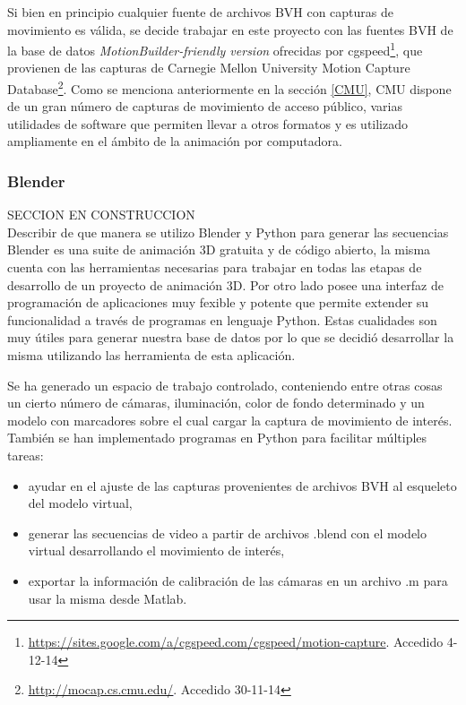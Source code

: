 Si bien en principio cualquier fuente de archivos BVH con capturas de movimiento es válida, se decide trabajar en este proyecto con las fuentes BVH de la base de datos \textit{MotionBuilder-friendly version} ofrecidas por cgspeed\footnote{\textcolor{blue}{\underline{\url{https://sites.google.com/a/cgspeed.com/cgspeed/motion-capture}}}. Accedido 4-12-14},
 que provienen de las capturas de Carnegie Mellon University Motion Capture Database\footnote{\textcolor{blue}{\underline{\url{http://mocap.cs.cmu.edu/}}}. Accedido 30-11-14}. 
 Como se menciona anteriormente en la sección \ref{CMU}, CMU dispone de un gran número de capturas de movimiento de acceso público, varias utilidades de software que permiten llevar a otros formatos y es utilizado ampliamente en el ámbito de la animación por computadora.




\subsubsection{Blender} SECCION EN CONSTRUCCION\\
Describir de que manera se utilizo Blender y  Python para generar las secuencias\\



Blender es una suite de animación 3D gratuita y de código abierto, la misma cuenta con las herramientas necesarias para trabajar en todas las etapas de desarrollo de un proyecto de animación 3D. Por otro lado posee una interfaz de programación de aplicaciones muy fexible y potente que permite extender su funcionalidad a través de programas en lenguaje Python. Estas cualidades son muy útiles para generar nuestra base de datos por lo que se decidió desarrollar la misma utilizando las herramienta de esta aplicación.

Se ha generado un espacio de trabajo controlado, conteniendo entre otras cosas un cierto número de cámaras, iluminación, color de fondo determinado y un modelo con marcadores sobre el cual cargar la captura de movimiento de interés. También se han implementado programas en Python para facilitar múltiples tareas:

\begin{itemize}
\item  ayudar en  el ajuste de las capturas provenientes de archivos BVH al esqueleto del modelo virtual,
\item	generar las secuencias de video a partir de archivos .blend  con el modelo virtual desarrollando el movimiento de interés,
\item	exportar la información de calibración de las cámaras en un archivo .m para usar la misma desde Matlab.
\end{itemize}


